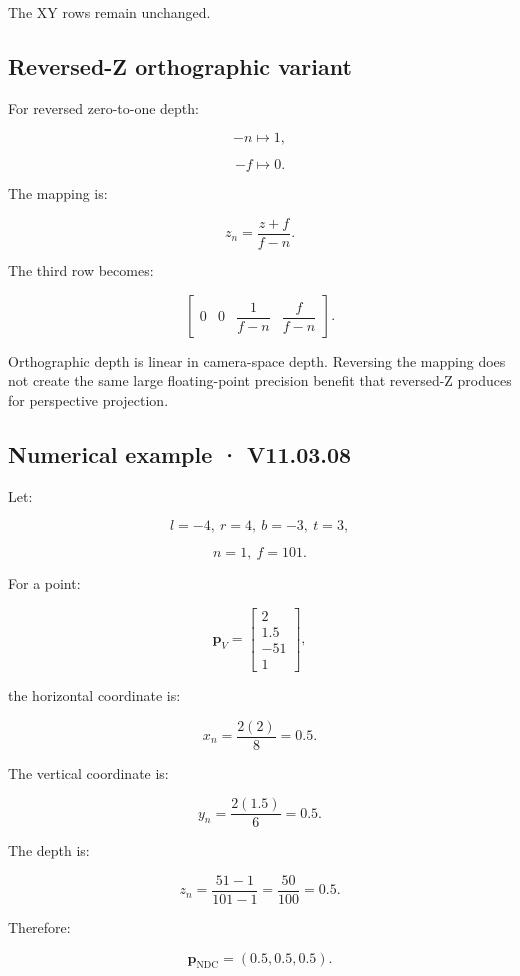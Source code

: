 The XY rows remain unchanged.

\subsection{Reversed-Z orthographic variant}\label{02-foundations-ii-ch033-reversed-z-orthographic-variant}

For reversed zero-to-one depth:

\[
 -n\mapsto1,
\]

\[
 -f\mapsto0.
\]

The mapping is:

\[
 \boxed{ z_n=\frac{z+f}{f-n} }.
\]

The third row becomes:

\[
 \begin{bmatrix} 0&0&\dfrac1{f-n}&\dfrac f{f-n} \end{bmatrix}.
\]

Orthographic depth is linear in camera-space depth. Reversing the mapping does not create the same large floating-point precision benefit that reversed-Z produces for perspective projection.

\subsection{Numerical example · V11.03.08}\label{02-foundations-ii-ch033-numerical-example-v11.03.08}

Let:

\[
 l=-4,\ r=4,\ b=-3,\ t=3,
\]

\[
 n=1,\ f=101.
\]

For a point:

\[
 \mathbf p_V= \begin{bmatrix}2\\1.5\\-51\\1\end{bmatrix},
\]

the horizontal coordinate is:

\[
 x_n=\frac{2(2)}8=0.5.
\]

The vertical coordinate is:

\[
 y_n=\frac{2(1.5)}6=0.5.
\]

The depth is:

\[
 z_n=\frac{51-1}{101-1}=\frac{50}{100}=0.5.
\]

Therefore:

\[
 \boxed{ \mathbf p_{\mathrm{NDC}}=(0.5,0.5,0.5) }.
\]

